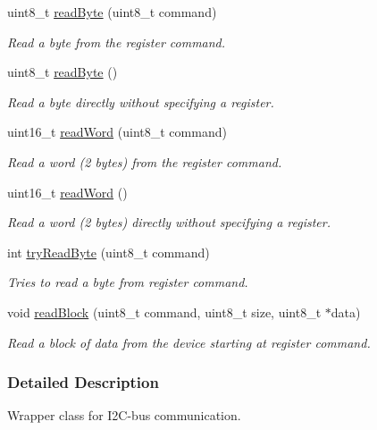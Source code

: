 \begin{DoxyCompactItemize}
uint8\-\_\-t \hyperlink{class_i2_c_bus_a3b7cd32f752e2a5eeb6a5bdaf9267282}{read\-Byte} (uint8\-\_\-t command)
\begin{DoxyCompactList}\small\item\em \-Read a byte from the register command. \end{DoxyCompactList}\item 
uint8\-\_\-t \hyperlink{class_i2_c_bus_a1f9b4e6e0771e3de031aab0f8c5bc691}{read\-Byte} ()
\begin{DoxyCompactList}\small\item\em \-Read a byte directly without specifying a register. \end{DoxyCompactList}\item 
uint16\-\_\-t \hyperlink{class_i2_c_bus_a4db730c58bf5bab95bae47c976ccd825}{read\-Word} (uint8\-\_\-t command)
\begin{DoxyCompactList}\small\item\em \-Read a word (2 bytes) from the register command. \end{DoxyCompactList}\item 
uint16\-\_\-t \hyperlink{class_i2_c_bus_a09abdc7887db46a7f9a26f37754ad6d1}{read\-Word} ()
\begin{DoxyCompactList}\small\item\em \-Read a word (2 bytes) directly without specifying a register. \end{DoxyCompactList}\item 
int \hyperlink{class_i2_c_bus_a9aefab7f4230de3dc45385d1c79d4fe5}{try\-Read\-Byte} (uint8\-\_\-t command)
\begin{DoxyCompactList}\small\item\em \-Tries to read a byte from register command. \end{DoxyCompactList}\item 
void \hyperlink{class_i2_c_bus_a3f0bed946e8431cacbac1f214ba03232}{read\-Block} (uint8\-\_\-t command, uint8\-\_\-t size, uint8\-\_\-t $\ast$data)
\begin{DoxyCompactList}\small\item\em \-Read a block of data from the device starting at register command. \end{DoxyCompactList}\end{DoxyCompactItemize}


\subsubsection{\-Detailed \-Description}
\-Wrapper class for \-I2\-C-\/bus communication. 

